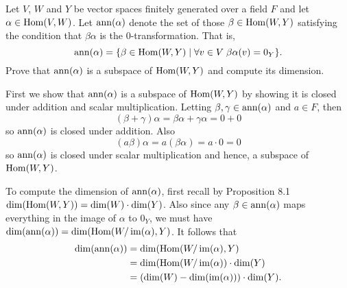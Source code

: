 \begin{problem}[Golan 251]
Let $V$, $W$ and $Y$ be vector spaces finitely generated over a field $F$ and let 
$\alpha \in \operatorname{Hom}(V, W)$.  Let $\operatorname{ann}(\alpha)$ denote the set of those 
$\beta \in \operatorname{Hom}(W,Y)$ satisfying the condition that $\beta\alpha$ is the 0-transformation.
That is, 
\[
\operatorname{ann}(\alpha) = \{ \beta\in \operatorname{Hom}(W,Y) \mid \forall v \in V \; \beta\alpha(v) = 0_Y\}.
\]
Prove that $\operatorname{ann}(\alpha)$ is a subspace of $\operatorname{Hom}(W,Y)$ and compute its
dimension.
\end{problem}
 \smallskip
 \begin{solution}
 First we show that $\operatorname{ann}(\alpha)$ is a subspace of $\operatorname{Hom}(W,Y)$ by showing it is closed under addition and scalar multiplication. Letting $\beta, \gamma \in \operatorname{ann}(\alpha)$ and $a\in F$, then
 $$
 (\beta + \gamma)\alpha = \beta \alpha + \gamma \alpha = 0+0
 $$
 so $\operatorname{ann}(\alpha)$ is closed under addition. Also
 $$
 (a\beta)\alpha = a(\beta\alpha) = a\cdot 0 = 0
 $$
 so $\operatorname{ann}(\alpha)$ is closed under scalar multiplication and hence, a subspace of $\operatorname{Hom}(W,Y)$. 

 To compute the dimension of $\operatorname{ann}(\alpha)$, first recall by Proposition 8.1 $\operatorname{dim}(\operatorname{Hom}(W,Y)) = \operatorname{dim}(W)\cdot \operatorname{dim}(Y)$. Also since any $\beta \in \operatorname{ann}(\alpha)$ maps everything in the image of $\alpha$ to $0_Y$, we must have $\operatorname{dim}(\operatorname{ann}(\alpha)) = \operatorname{dim}(\operatorname{Hom}(W/\operatorname{im}(\alpha), Y)$. It follows that
\begin{align*}
\operatorname{dim}(\operatorname{ann}(\alpha)) &= \operatorname{dim}(\operatorname{Hom}(W/\operatorname{im}(\alpha), Y) \\
&= \operatorname{dim}(\operatorname{Hom}(W/\operatorname{im}(\alpha))\cdot \operatorname{dim}(Y) \\
&= (\operatorname{dim}(W) - \operatorname{dim}(\operatorname{im}(\alpha)))\cdot \operatorname{dim}(Y).
\end{align*}
 
 \end{solution}

\probskip

